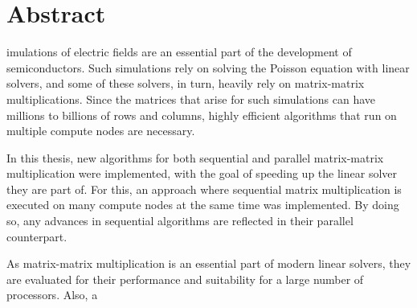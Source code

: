 %
%
%

\chapter*{Abstract}

imulations of electric fields are an essential part of the development of semiconductors. Such simulations rely on solving the Poisson equation with linear solvers, and some of these solvers, in turn, heavily rely on matrix-matrix multiplications. Since the matrices that arise for such simulations can have millions to billions of rows and columns, highly efficient algorithms that run on multiple compute nodes are necessary. 

In this thesis, new algorithms for both sequential and parallel matrix-matrix multiplication were implemented, with the goal of speeding up the linear solver they are part of. For this, an approach where sequential matrix multiplication is executed on many compute nodes at the same time was implemented. By doing so, any advances in sequential algorithms are reflected in their parallel counterpart.

As matrix-matrix multiplication is an essential part of modern linear solvers, they are evaluated for their performance and suitability for a large number of processors. Also, a 

\clearpage